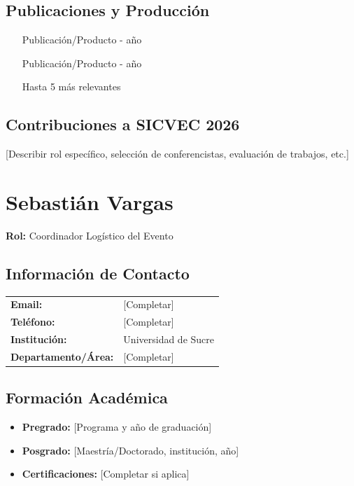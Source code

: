 \documentclass[12pt,a4paper]{article}
\begin{document}
\subsection{Publicaciones y Producción}

\begin{enumerate}[label={\textcolor{verdeosc}{\arabic{*}.}}]
  \item [Publicación/Producto - año]
  \item [Publicación/Producto - año]
  \item [Hasta 5 más relevantes]
\end{enumerate}

\subsection{Contribuciones a SICVEC 2026}

[Describir rol específico, selección de conferencistas, evaluación de trabajos, etc.]

\vspace{1.5cm}

\section{Sebastián Vargas}

\textbf{Rol:} Coordinador Logístico del Evento

\subsection{Información de Contacto}

\begin{tabular}{ll}
\textbf{Email:} & [Completar] \\
\textbf{Teléfono:} & [Completar] \\
\textbf{Institución:} & Universidad de Sucre \\
\textbf{Departamento/Área:} & [Completar] \\
\end{tabular}

\subsection{Formación Académica}

\begin{itemize}[label={\textcolor{verdeosc}{\textbullet}}]
  \item \textbf{Pregrado:} [Programa y año de graduación]
  \item \textbf{Posgrado:} [Maestría/Doctorado, institución, año]
  \item \textbf{Certificaciones:} [Completar si aplica]
\end{itemize}
\end{document}
